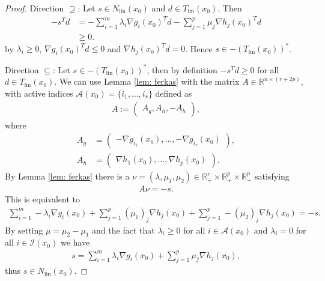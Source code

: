 \begin{proof}
    Direction $\supseteq$: Let $s \in N_{\text{lin} }(x_0)$ and $d \in
    T_{\text{lin} }(x_0)$. Then
    \begin{align}
        -s^{T} d &= -\sum_{i=1}^{m} \lambda_i\nabla g_i(x_0)^{T}d
        -\sum_{j=1}^{p} \mu_j \nabla h_j(x_0)^{T} d\\
                 &\ge 0.
    \end{align}
    by $\lambda_i \ge0$, $\nabla g_i(x_0)^T d \le 0$ and $\nabla
    h_j(x_0)^{T} d =0 $. Hence $s \in -(T_{\text{lin} }(x_0))^{*}$.

    Direction $\subseteq$: Let $s \in -(T_{\text{lin} }(x_0))^{*}$, then by
    definition $-s^{T} d \ge 0$ for all $d \in T_{\text{lin}}(x_0)$. We can
    use Lemma \ref{lem: ferkas} with the matrix $A \in \mathbb{R}^{n\times
    (r + 2p)}$, with active indices $\mathcal{A}(x_0) = \{i_1, \ldots, i_r\}
    $ defined as
    \begin{align}
        A:=\begin{pmatrix} A_g, A_h, -A_h
        \end{pmatrix},
    \end{align}
    where
    \begin{align}
        A_g &=
        \begin{pmatrix}
        -\nabla g_{i_1}(x_0),\ldots,-\nabla g_{i_r}(x_0)
        \end{pmatrix},\\
        A_h &=
        \begin{pmatrix}
            \nabla h_1(x_0),\ldots,\nabla h_p(x_0)
        \end{pmatrix} .
    \end{align}
    By Lemma \ref{lem: ferkas} there is a $\nu = (\lambda, \mu_1, \mu_2) \in
    \mathbb{R}_+^{r}\times \mathbb{R}^{p}_+\times \mathbb{R}_+^{p}$
    satisfying
    \begin{align}
        A\nu = -s.
    \end{align}
    This is equivalent to
    \begin{align}
        \sum_{i=1}^{m} -\lambda_i\nabla g_i(x_0)
        +\sum_{j=1}^{p} (\mu_1)_j\nabla h_j(x_0)
        +\sum_{j=1}^{p} -(\mu_2)_j\nabla h_j(x_0) = -s.
    \end{align}
    By setting $\mu = \mu_2 - \mu_1$ and the fact that $\lambda_i \ge 0$ for
    all $i \in \mathcal{A}(x_0)$ and $ \lambda_i =0$ for all $i \in
    \mathcal{I}(x_0)$ we have
    \begin{align}
       s =  \sum_{i=1}^{m} \lambda_i\nabla g_i(x_0)
        +\sum_{j=1}^{p} \mu_j\nabla h_j(x_0),
    \end{align}
    thus $s \in N_{\text{lin}}(x_0)$.
\end{proof}

